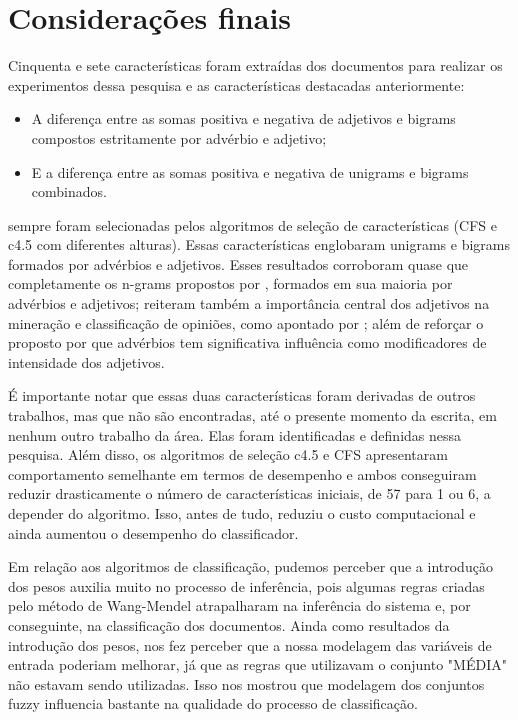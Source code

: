 \documentclass[template.tex]{subfiles}
\begin{document}
\section{Considerações finais}

Cinquenta e sete características foram extraídas dos documentos para realizar os experimentos dessa pesquisa e as características destacadas anteriormente: 

\begin{itemize}
\item A diferença entre as somas positiva e negativa de adjetivos e bigrams compostos estritamente por advérbio e adjetivo;
\item E a diferença entre as somas positiva e negativa de unigrams e bigrams combinados.
\end{itemize}

sempre foram selecionadas pelos algoritmos de seleção de características (CFS e c4.5 com diferentes alturas). Essas características englobaram unigrams e bigrams formados por advérbios e adjetivos. Esses resultados corroboram quase que completamente os n-grams propostos por , formados em sua maioria por advérbios e adjetivos; reiteram também a importância central dos adjetivos na mineração e classificação de opiniões, como apontado por ; além de reforçar o proposto por  que advérbios tem significativa influência como modificadores de intensidade dos adjetivos. 

É importante notar que essas duas características foram derivadas de outros trabalhos, mas que não são encontradas, até o presente momento da escrita, em nenhum outro trabalho da área. Elas foram identificadas e definidas nessa pesquisa. Além disso, os algoritmos de seleção c4.5 e CFS apresentaram comportamento semelhante em termos de desempenho e ambos conseguiram reduzir drasticamente o número de características iniciais, de 57 para 1 ou 6, a depender do algoritmo. Isso, antes de tudo, reduziu o custo computacional e ainda aumentou o desempenho do classificador. 

Em relação aos algoritmos de classificação, pudemos perceber que a introdução dos pesos auxilia muito no processo de inferência, pois algumas regras criadas pelo método de Wang-Mendel atrapalharam na inferência do sistema e, por conseguinte, na classificação dos documentos. Ainda como resultados da introdução dos pesos, nos fez perceber que a nossa modelagem das variáveis de entrada poderiam melhorar, já que as regras que utilizavam o conjunto "MÉDIA" não estavam sendo utilizadas. Isso nos mostrou que modelagem dos conjuntos fuzzy influencia bastante na qualidade do processo de classificação.

\end{document}
